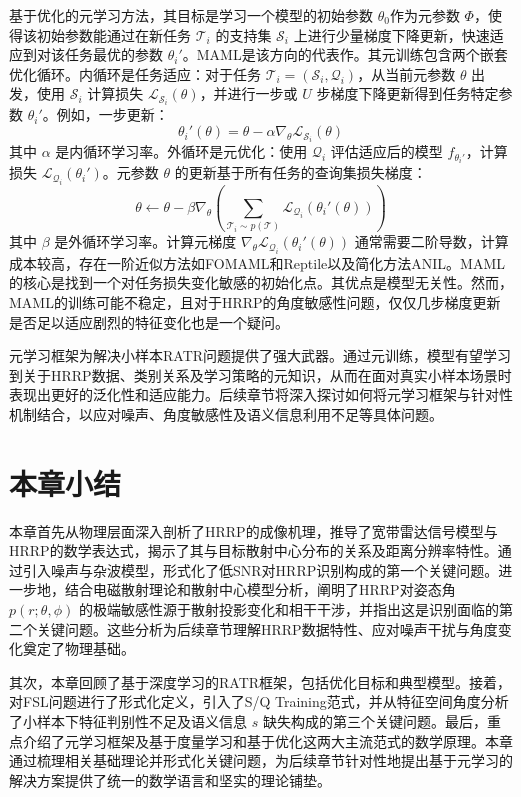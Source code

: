 基于优化的元学习方法，其目标是学习一个模型的初始参数 $\theta_0$作为元参数 $\Phi$，使得该初始参数能通过在新任务 $\mathcal{T}_i$ 的支持集 $\mathcal{S}_i$ 上进行少量梯度下降更新，快速适应到对该任务最优的参数 $\theta_i'$。MAML是该方向的代表作。其元训练包含两个嵌套优化循环。内循环是任务适应：对于任务 $\mathcal{T}_i=(\mathcal{S}_i, \mathcal{Q}_i)$，从当前元参数 $\theta$ 出发，使用 $\mathcal{S}_i$ 计算损失 $\mathcal{L}_{\mathcal{S}_i}(\theta)$，并进行一步或 $U$ 步梯度下降更新得到任务特定参数 $\theta_i'$。例如，一步更新：
\begin{equation}
    \theta_i'(\theta) = \theta - \alpha \nabla_\theta \mathcal{L}_{\mathcal{S}_i}(\theta)
    \label{eq:maml_inner_update}
\end{equation}
其中 $\alpha$ 是内循环学习率。外循环是元优化：使用 $\mathcal{Q}_i$ 评估适应后的模型 $f_{\theta_i'}$，计算损失 $\mathcal{L}_{\mathcal{Q}_i}(\theta_i')$。元参数 $\theta$ 的更新基于所有任务的查询集损失梯度：
\begin{equation}
    \theta \leftarrow \theta - \beta \nabla_\theta \left( \sum_{\mathcal{T}_i \sim p(\mathcal{T})} \mathcal{L}_{\mathcal{Q}_i}(\theta_i'(\theta)) \right)
    \label{eq:maml_outer_update}
\end{equation}
其中 $\beta$ 是外循环学习率。计算元梯度 $\nabla_\theta \mathcal{L}_{\mathcal{Q}_i}(\theta_i'(\theta))$ 通常需要二阶导数，计算成本较高，存在一阶近似方法如FOMAML和Reptile以及简化方法ANIL。MAML的核心是找到一个对任务损失变化敏感的初始化点。其优点是模型无关性。然而，MAML的训练可能不稳定，且对于HRRP的角度敏感性问题，仅仅几步梯度更新是否足以适应剧烈的特征变化也是一个疑问。


元学习框架为解决小样本RATR问题提供了强大武器。通过元训练，模型有望学习到关于HRRP数据、类别关系及学习策略的元知识，从而在面对真实小样本场景时表现出更好的泛化性和适应能力。后续章节将深入探讨如何将元学习框架与针对性机制结合，以应对噪声、角度敏感性及语义信息利用不足等具体问题。

\section{本章小结}
\label{sec:theory_summary}
本章首先从物理层面深入剖析了HRRP的成像机理，推导了宽带雷达信号模型与HRRP的数学表达式，揭示了其与目标散射中心分布的关系及距离分辨率特性。通过引入噪声与杂波模型，形式化了低SNR对HRRP识别构成的第一个关键问题。进一步地，结合电磁散射理论和散射中心模型分析，阐明了HRRP对姿态角 $p(r; \theta, \phi)$ 的极端敏感性源于散射投影变化和相干干涉，并指出这是识别面临的第二个关键问题。这些分析为后续章节理解HRRP数据特性、应对噪声干扰与角度变化奠定了物理基础。

其次，本章回顾了基于深度学习的RATR框架，包括优化目标和典型模型。接着，对FSL问题进行了形式化定义，引入了S/Q Training范式，并从特征空间角度分析了小样本下特征判别性不足及语义信息 $s$ 缺失构成的第三个关键问题。最后，重点介绍了元学习框架及基于度量学习和基于优化这两大主流范式的数学原理。本章通过梳理相关基础理论并形式化关键问题，为后续章节针对性地提出基于元学习的解决方案提供了统一的数学语言和坚实的理论铺垫。